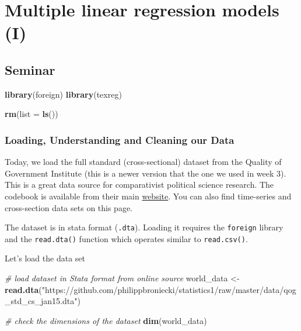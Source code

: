\documentclass[]{article}
\newenvironment{Shaded}{\begin{snugshade}}{\end{snugshade}}
\newcommand{\KeywordTok}[1]{\textcolor[rgb]{0.13,0.29,0.53}{\textbf{#1}}}
\newcommand{\DataTypeTok}[1]{\textcolor[rgb]{0.13,0.29,0.53}{#1}}
\newcommand{\StringTok}[1]{\textcolor[rgb]{0.31,0.60,0.02}{#1}}
\newcommand{\CommentTok}[1]{\textcolor[rgb]{0.56,0.35,0.01}{\textit{#1}}}
\newcommand{\NormalTok}[1]{#1}
\theoremstyle{definition}
\theoremstyle{definition}
\theoremstyle{definition}
\theoremstyle{remark}
\begin{document}
\section{Multiple linear regression models
(I)}\label{multiple-linear-regression-models-i}

\subsection{Seminar}\label{seminar-6}

\begin{Shaded}
\begin{Highlighting}[]
\KeywordTok{library}\NormalTok{(foreign) }
\KeywordTok{library}\NormalTok{(texreg)}
\end{Highlighting}
\end{Shaded}

\begin{Shaded}
\begin{Highlighting}[]
\KeywordTok{rm}\NormalTok{(}\DataTypeTok{list =} \KeywordTok{ls}\NormalTok{())}
\end{Highlighting}
\end{Shaded}

\subsubsection{Loading, Understanding and Cleaning our
Data}\label{loading-understanding-and-cleaning-our-data}

Today, we load the full standard (cross-sectional) dataset from the
Quality of Government Institute (this is a newer version that the one we
used in week 3). This is a great data source for comparativist political
science research. The codebook is available from their main
\href{http://qog.pol.gu.se/data/datadownloads/qogstandarddata}{website}.
You can also find time-series and cross-section data sets on this page.

The dataset is in stata format (\texttt{.dta}). Loading it requires the
\texttt{foreign} library and the \texttt{read.dta()} function which
operates similar to \texttt{read.csv()}.

Let's load the data set

\begin{Shaded}
\begin{Highlighting}[]
\CommentTok{# load dataset in Stata format from online source}
\NormalTok{world_data <-}\StringTok{ }\KeywordTok{read.dta}\NormalTok{(}\StringTok{"https://github.com/philippbroniecki/statistics1/raw/master/data/qog_std_cs_jan15.dta"}\NormalTok{)}

\CommentTok{# check the dimensions of the dataset}
\KeywordTok{dim}\NormalTok{(world_data)}
\end{Highlighting}
\end{Shaded}
\end{document}
